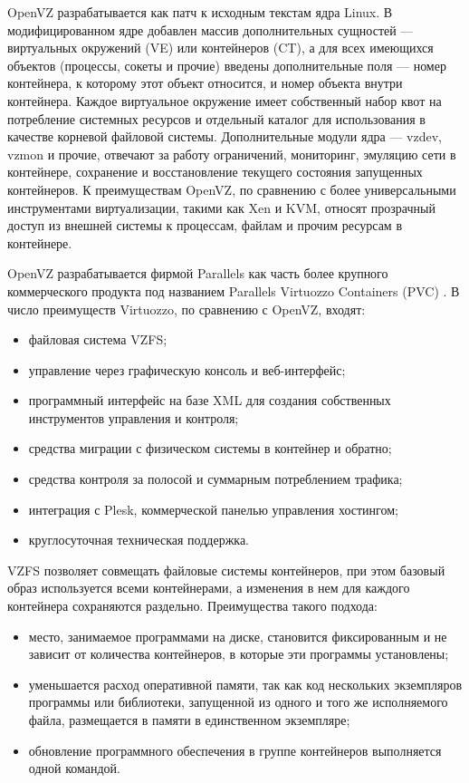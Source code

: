 OpenVZ разрабатывается как патч к исходным текстам ядра Linux.
В модифицированном ядре добавлен массив дополнительных сущностей --- виртуальных окружений (VE) или контейнеров (CT), а для всех имеющихся объектов (процессы, сокеты и прочие) введены дополнительные поля --- номер контейнера, к которому этот объект относится, и номер объекта внутри контейнера.
Каждое виртуальное окружение имеет собственный набор квот на потребление системных ресурсов и отдельный каталог для использования в качестве корневой файловой системы.
Дополнительные модули ядра --- vzdev, vzmon и прочие, отвечают за работу ограничений, мониторинг, эмуляцию сети в контейнере, сохранение и восстановление текущего состояния запущенных контейнеров.
К преимуществам OpenVZ, по сравнению с более универсальными инструментами виртуализации, такими как Xen и KVM, относят прозрачный доступ из внешней системы к процессам, файлам и прочим ресурсам в контейнере.

OpenVZ разрабатывается фирмой Parallels как часть более крупного коммерческого продукта под названием Parallels Virtuozzo Containers (PVC) \cite{lxc-openvz}.
В число преимуществ Virtuozzo, по сравнению с OpenVZ, входят:
\begin{itemize}
  \item файловая система VZFS;
  \item управление через графическую консоль и веб-интерфейс;
  \item программный интерфейс на базе XML для создания собственных инструментов управления и контроля;
  \item средства миграции с физическом системы в контейнер и обратно;
  \item средства контроля за полосой и суммарным потреблением трафика;
  \item интеграция с Plesk, коммерческой панелью управления хостингом;
  \item круглосуточная техническая поддержка.
\end{itemize}

VZFS позволяет совмещать файловые системы контейнеров, при этом базовый образ используется всеми контейнерами, а изменения в нем для каждого контейнера сохраняются раздельно.
Преимущества такого подхода:
\begin{itemize}
  \item место, занимаемое программами на диске, становится фиксированным и не зависит от количества контейнеров, в которые эти программы установлены;
  \item уменьшается расход оперативной памяти, так как код нескольких экземпляров программы или библиотеки, запущенной из одного и того же исполняемого файла, размещается в памяти в единственном экземпляре;
  \item обновление программного обеспечения в группе контейнеров выполняется одной командой.
\end{itemize}

